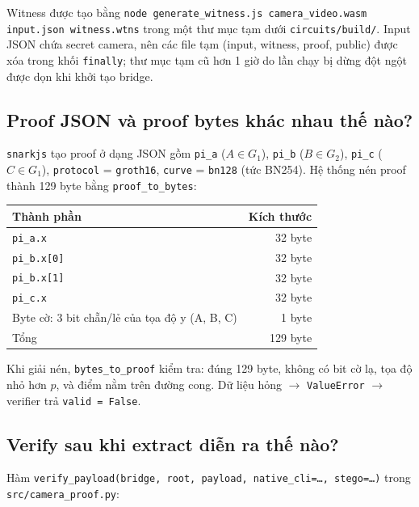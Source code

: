 \documentclass[11pt,a4paper]{article}
\begin{document}
Witness được tạo bằng \texttt{node generate\_witness.js camera\_video.wasm input.json
witness.wtns} trong một thư mục tạm dưới \texttt{circuits/build/}. Input JSON chứa
secret camera, nên các file tạm (input, witness, proof, public) được xóa trong khối
\texttt{finally}; thư mục tạm cũ hơn 1 giờ do lần chạy bị dừng đột ngột được dọn khi
khởi tạo bridge.

\subsection{Proof JSON và proof bytes khác nhau thế nào?}

\texttt{snarkjs} tạo proof ở dạng JSON gồm \texttt{pi\_a} (\(A \in G_1\)),
\texttt{pi\_b} (\(B \in G_2\)), \texttt{pi\_c} (\(C \in G_1\)), \texttt{protocol}
= \texttt{groth16}, \texttt{curve} = \texttt{bn128} (tức BN254). Hệ thống nén proof
thành 129 byte bằng \texttt{proof\_to\_bytes}:

\begin{center}
\begin{tabular}{lr}
\toprule
Thành phần & Kích thước \\
\midrule
\texttt{pi\_a.x} & 32 byte \\
\texttt{pi\_b.x[0]} & 32 byte \\
\texttt{pi\_b.x[1]} & 32 byte \\
\texttt{pi\_c.x} & 32 byte \\
Byte cờ: 3 bit chẵn/lẻ của tọa độ y (A, B, C) & 1 byte \\
\midrule
Tổng & 129 byte \\
\bottomrule
\end{tabular}
\end{center}

Khi giải nén, \texttt{bytes\_to\_proof} kiểm tra: đúng 129 byte, không có bit cờ lạ,
tọa độ nhỏ hơn \(p\), và điểm nằm trên đường cong. Dữ liệu hỏng \(\rightarrow\)
\texttt{ValueError} \(\rightarrow\) verifier trả \texttt{valid = False}.

\subsection{Verify sau khi extract diễn ra thế nào?}

Hàm \texttt{verify\_payload(bridge, root, payload, native\_cli=\ldots, stego=\ldots)}
trong \nolinkurl{src/camera_proof.py}:
\end{document}

